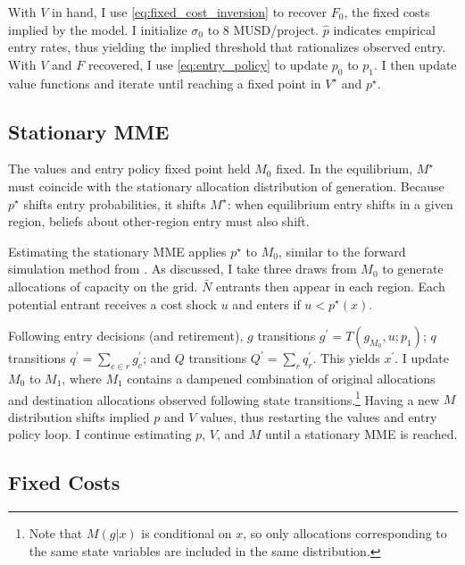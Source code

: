 \documentclass[12pt]{article}
\begin{document}
With $V$ in hand, I use \ref{eq:fixed_cost_inversion} to recover $F_0$, the fixed costs implied by the model. I initialize $\sigma_0$ to 8 MUSD/project. $\hat{p}$ indicates empirical entry rates, thus yielding the implied threshold that rationalizes observed entry. With $V$ and $F$ recovered, I use \ref{eq:entry_policy} to update $p_0$ to $p_1$. I then update value functions and iterate until reaching a fixed point in $V^\star$ and $p^\star$.

\subsection{Stationary MME}

The values and entry policy fixed point held $M_0$ fixed. In the equilibrium, $M^\star$ must coincide with the stationary allocation distribution of generation. Because $p^\star$ shifts entry probabilities, it shifts $M^\star$: when equilibrium entry shifts in a given region, beliefs about other-region entry must also shift. 

Estimating the stationary MME applies $p^\star$ to $M_0$, similar to the forward simulation method from \cite{IfrachWeintraub2017}. As discussed, I take three draws from $M_0$ to generate allocations of capacity on the grid. $\bar{N}$ entrants then appear in each region. Each potential entrant receives a cost shock $u$ and enters if $u < p^\star(x)$. 

Following entry decisions (and retirement), $g$ transitions $g^\prime = T(g_{M_0}, u; p_1)$; $q$ transitions $q^\prime = \sum_{c \in r} g^\prime_c$; and $Q$ transitions $Q^\prime = \sum_r q^\prime_r$. This yields $x^\prime$. I update $M_0$ to $M_1$, where $M_1$ contains a dampened combination of original allocations and destination allocations observed following state transitions.\footnote{Note that $M(g|x)$ is conditional on $x$, so only allocations corresponding to the same state variables are included in the same distribution.} Having a new $M$ distribution shifts implied $p$ and $V$ values, thus restarting the values and entry policy loop. I continue estimating $p$, $V$, and $M$ until a stationary MME is reached. 

\subsection{Fixed Costs}
\end{document}
